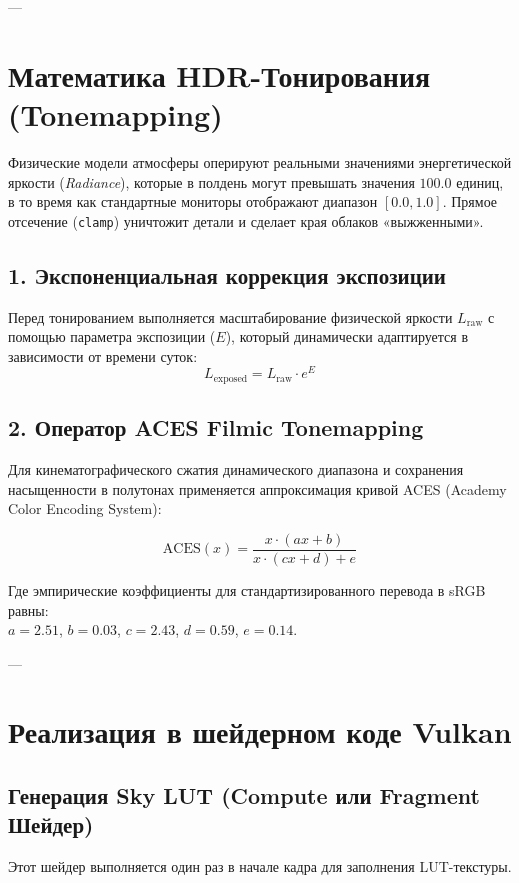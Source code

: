 \documentclass[11pt,a4paper]{article}
\begin{document}
---

\section{Математика HDR-Тонирования (Tonemapping)}
Физические модели атмосферы оперируют реальными значениями энергетической яркости (\textit{Radiance}), которые в полдень могут превышать значения $100.0$ единиц, в то время как стандартные мониторы отображают диапазон $[0.0, 1.0]$. Прямое отсечение (\texttt{clamp}) уничтожит детали и сделает края облаков «выжженными».

\subsection{1. Экспоненциальная коррекция экспозиции}
Перед тонированием выполняется масштабирование физической яркости $L_{\text{raw}}$ с помощью параметра экспозиции ($E$), который динамически адаптируется в зависимости от времени суток:
\begin{equation}
    L_{\text{exposed}} = L_{\text{raw}} \cdot e^{E}
\end{equation}

\subsection{2. Оператор ACES Filmic Tonemapping}
Для кинематографического сжатия динамического диапазона и сохранения насыщенности в полутонах применяется аппроксимация кривой ACES (Academy Color Encoding System):

\begin{equation}
    \text{ACES}(x) = \frac{x \cdot (ax + b)}{x \cdot (cx + d) + e}
\end{equation}

Где эмпирические коэффициенты для стандартизированного перевода в sRGB равны:\\
$a = 2.51$, $b = 0.03$, $c = 2.43$, $d = 0.59$, $e = 0.14$.

---

\section{Реализация в шейдерном коде Vulkan}

\subsection{Генерация Sky LUT (Compute или Fragment Шейдер)}
Этот шейдер выполняется один раз в начале кадра для заполнения LUT-текстуры.
\end{document}
